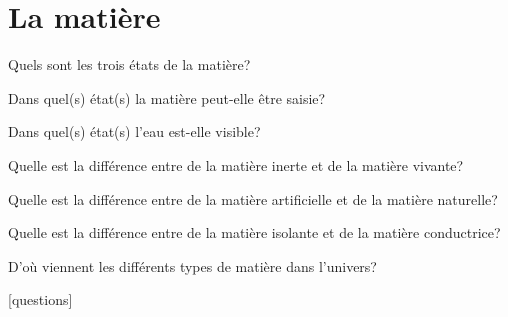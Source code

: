 \documentclass[11pt]{exam}		%
\title{\Titre}
\newcommand{\Titre}{La matière} %
\newcommand{\ConsignesGenerales}{
	
	\begin{itemize}
		\item Noter nom et prénom et classe en haut à gauche de la page.
		\item Répondre aux questions sur les pointillés.
		\item Répondre aux questions par des phrases.
		\item Essayer de répondre à toutes les questions.
		\item Ne pas perdre trop de temps si on ne sait pas/comprends 
		pas et passer à la suite pour avoir un maximum de points! 
		\vspace{-5pt}
	\end{itemize}}
\begin{document}
\thispagestyle{headandfoot}

\section{\Titre} %

\headrule
\footrule
\setlength{\columnsep}{0.25cm}
\setlength{\columnseprule}{1pt}





		


\begin{questions}
\question[1\half] 
Quels sont les trois états de la matière?

\question[1] 
Dans quel(s) état(s) la matière peut-elle être saisie?

\question[1] 
Dans quel(s) état(s) l'eau est-elle visible?

\question[1\half] 
Quelle est la différence entre de la matière inerte et de la matière vivante?

\question[1\half] 
Quelle est la différence entre de la matière artificielle et de la matière naturelle?

\question[1\half] 
Quelle est la différence entre de la matière isolante et de la matière conductrice?


\question[2] 
D'où viennent les différents types de matière dans l'univers?



\end{questions}


\vfill
\begin{center}
\setlength{\doublerulesep}{0.25in}
[questions]
\vspace{-25pt}
\end{center}
\end{document}
